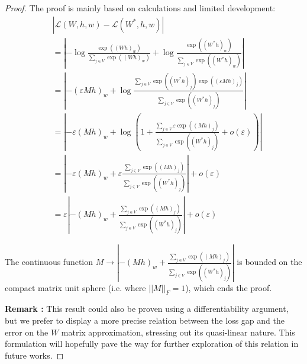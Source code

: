 \begin{proof}
     The proof is mainly based on calculations and limited development:
     \begin{align*}
     & |\mathcal{L}(W, h, w) - \mathcal{L}(W^*, h, w)| \\
     & =
     \left| -\log \frac{\exp((Wh)_w)}{\sum_{j \in V} \exp((Wh)_{w})} + \log\frac{\exp((W^*h)_{w})}{\sum_{j \in V} \exp((W^*h)_w)}\right| \\
     & =  \left|-(\varepsilon Mh)_{w} + \log \frac{\sum_{j \in V} \exp((W^*h)_{j}) \exp((\varepsilon Mh)_{j})}{\sum_{j \in V} \exp((W^*h)_{j})}\right| \\
     & = \left| - \varepsilon (M h)_{w} + \log\left( 1 + \frac{\sum_{j \in V} \varepsilon \exp((Mh)_{j})}{\sum_{j \in V} \exp((W^*h)_{j})} + o(\varepsilon) \right) \right| \\
     & = \left| -\varepsilon (M h)_{w} + \varepsilon  \frac{\sum_{j \in V} \exp((Mh)_{j})}{\sum_{j \in V} \exp((W^*h)_{j})} \right| + o(\varepsilon) \\
     & = \varepsilon \left| - (M h)_{w} + \frac{\sum_{j \in V} \exp((Mh)_{j})}{\sum_{j \in V} \exp((W^*h)_{j})} \right| + o(\varepsilon)
     \end{align*}
     
     The continuous function $M \longrightarrow \left| - (M h)_{w} + \frac{\sum_{j \in V} \exp((Mh)_{j})}{\sum_{j \in V} \exp((W^*h)_{j})} \right|$ is bounded on the compact matrix unit sphere (i.e. where $||M||_F = 1$), which ends the proof.
     
     \textbf{Remark : }This result could also be proven using a differentiability argument, but we prefer to display a more precise relation between the loss gap and the error on the $W$ matrix approximation, stressing out its quasi-linear nature. This formulation will hopefully pave the way for further exploration of this relation in future works.
     
\end{proof}

